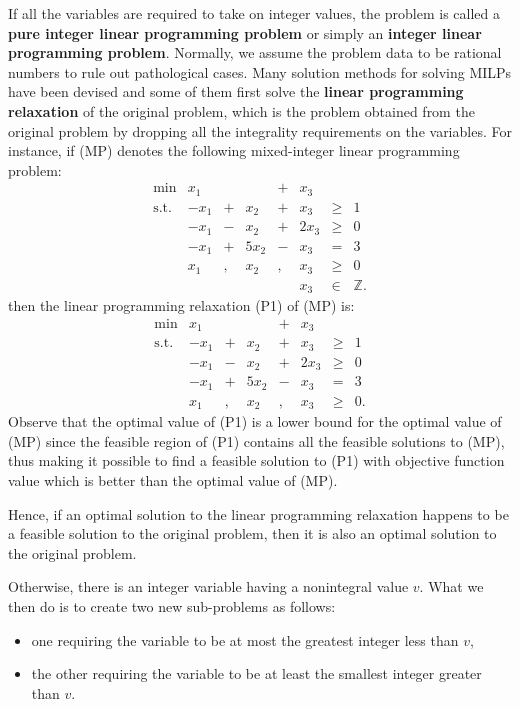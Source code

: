 If all the variables are required to take on integer values, the problem
is called a \textbf{pure integer linear programming problem} or simply an
\textbf{integer linear programming problem}. Normally, we assume the
problem data to be rational numbers to rule out pathological cases.
\newl Many solution methods for solving MILPs have been devised and some of
them first solve the \textbf{linear programming relaxation} of the
original problem, which is the problem obtained from the original
problem by dropping all the integrality requirements on the variables.
\newpage\noindent For instance, if (MP) denotes the following mixed-integer linear programming problem:
\[\begin{array}{rrcrcrlll}
\min & x_1 &  &  & + & x_3  \\
\mbox{s.t.} & -x_1 & + &  x_2 & + &  x_3  & \geq & 1 \\
& -x_1 & - &  x_2 & + & 2x_3  & \geq & 0 \\
& -x_1 & + & 5x_2 & - &  x_3  & = & 3 \\
&  x_1 & , & x_2 & , & x_3 & \geq & 0 \\
&      &   &     &   & x_3  & \in & \mathbb{Z}. 
\end{array}\]
then the linear programming relaxation (P1) of (MP) is: \[\begin{array}{rrcrcrlll}
\mbox{min} & x_1 &  &  & + & x_3  \\
\text{s.t.} & -x_1 & + &  x_2 & + &  x_3  & \geq & 1 \\
& -x_1 & - &  x_2 & + & 2x_3  & \geq & 0 \\
& -x_1 & + & 5x_2 & - &  x_3  & = & 3 \\
&  x_1 & , & x_2 & , & x_3 & \geq & 0.
\end{array}\]
Observe that the optimal value of (P1) is a lower bound for the optimal value of (MP)
since the feasible region of (P1) contains all the feasible solutions to
(MP), thus making it possible to find a feasible solution to (P1) with
objective function value which is better than the optimal value of (MP). \par Hence,
if an optimal solution to the linear programming relaxation happens to
be a feasible solution to the original problem, then it is also an
optimal solution to the original problem. \par Otherwise, there is an integer
variable having a nonintegral value \(v\). What we then do is to create
two new sub-problems as follows: 
\begin{itemize}[noitemsep]
\item one requiring the variable to be at most the greatest integer less than \(v\), 
\item the other requiring the variable to be at least the smallest integer greater than \(v\).
\end{itemize}
